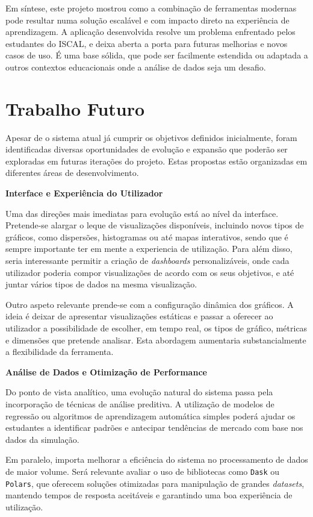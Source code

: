 Em síntese, este projeto mostrou como a combinação de ferramentas modernas pode resultar numa solução escalável e com impacto direto na experiência de aprendizagem. A aplicação desenvolvida resolve um problema enfrentado pelos estudantes do ISCAL, e deixa aberta a porta para futuras melhorias e novos casos de uso. É uma base sólida, que pode ser facilmente estendida ou adaptada a outros contextos educacionais onde a análise de dados seja um desafio.

\section{Trabalho Futuro}

Apesar de o sistema atual já cumprir os objetivos definidos inicialmente, foram identificadas diversas oportunidades de evolução e expansão que poderão ser exploradas em futuras iterações do projeto. Estas propostas estão organizadas em diferentes áreas de desenvolvimento.

\textbf{Interface e Experiência do Utilizador}

Uma das direções mais imediatas para evolução está ao nível da interface. Pretende-se alargar o leque de visualizações disponíveis, incluindo novos tipos de gráficos, como dispersões, histogramas ou até mapas interativos, sendo que é sempre importante ter em mente a experiencia de utilização. Para além disso, seria interessante permitir a criação de \textit{dashboards} personalizáveis, onde cada utilizador poderia compor visualizações de acordo com os seus objetivos, e até juntar vários tipos de dados na mesma visualização.

Outro aspeto relevante prende-se com a configuração dinâmica dos gráficos. A ideia é deixar de apresentar visualizações estáticas e passar a oferecer ao utilizador a possibilidade de escolher, em tempo real, os tipos de gráfico, métricas e dimensões que pretende analisar. Esta abordagem aumentaria substancialmente a flexibilidade da ferramenta.

\textbf{Análise de Dados e Otimização de Performance}

Do ponto de vista analítico, uma evolução natural do sistema passa pela incorporação de técnicas de análise preditiva. A utilização de modelos de regressão ou algoritmos de aprendizagem automática simples poderá ajudar os estudantes a identificar padrões e antecipar tendências de mercado com base nos dados da simulação.

Em paralelo, importa melhorar a eficiência do sistema no processamento de dados de maior volume. Será relevante avaliar o uso de bibliotecas como \texttt{Dask} ou \texttt{Polars}, que oferecem soluções otimizadas para manipulação de grandes \textit{datasets}, mantendo tempos de resposta aceitáveis e garantindo uma boa experiência de utilização.


